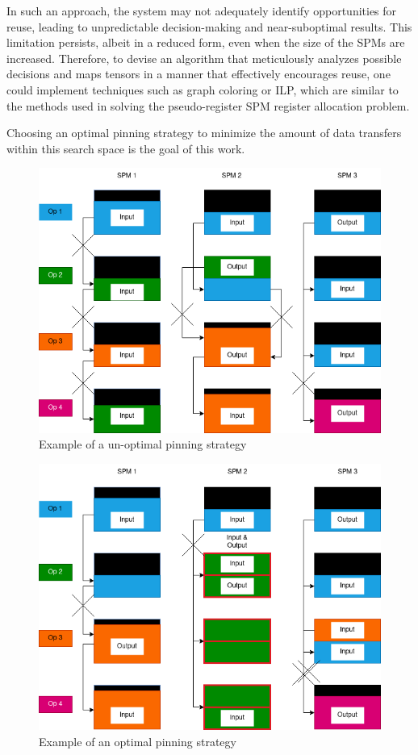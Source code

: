 In such an approach, the system may not adequately identify opportunities for
reuse, leading to unpredictable decision-making and near-suboptimal results.
This limitation persists, albeit in a reduced form, even when the size of the
SPMs are increased. Therefore, to devise an algorithm that meticulously analyzes
possible decisions and maps tensors in a manner that effectively encourages
reuse, one could implement techniques such as graph coloring or ILP, which are
similar to the methods used in solving the pseudo-register SPM register
allocation problem.

Choosing an optimal pinning strategy to minimize the amount of data transfers
within this search space is the goal of this work.


\begin{figure}[th]
\centering
\includegraphics[scale=0.7]{Figures/reuse_example_pin_map_fail_1.png}
\decoRule
\caption[pin_naive]{Example of a un-optimal pinning strategy}
\label{fig:pin_naive}
\end{figure}


\begin{figure}[th]
\centering
\includegraphics[scale=0.7]{Figures/reuse_example_pin_all.png}
\decoRule
\caption[pin_optimal]{Example of an optimal pinning strategy}
\label{fig:pin_optimal}
\end{figure}

